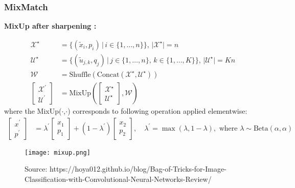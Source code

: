 \documentclass[aspectratio=169,11pt]{beamer}
\begin{document}
\begin{frame}
    \frametitle{MixMatch}
    
    \textbf{MixUp after sharpening :}
    {\footnotesize
    \begin{align*}
        \mathcal{X}^\star &= \{ (\tilde{x}_i,p_i)\,|\, i \in \{1,\dots,n\}  \}, \, |\mathcal{X}^\star| = n \\
        \mathcal{U}^\star &= \{ (\tilde{u}_{j,k},q_j)\,|\, j \in \{1,\dots,n\},\,k \in \{1,\dots,K\}  \}, \, |\mathcal{U}^\star| = Kn\\
        \mathcal{W} &= \text{Shuffle}(\text{Concat}(\mathcal{X}^\star,\mathcal{U}^\star))\\
        \begin{bmatrix} \mathcal{X}^\prime \\ \mathcal{U}^\prime \end{bmatrix} &= \text{MixUp}(\begin{bmatrix} \mathcal{X}^\star \\ \mathcal{U}^\star \end{bmatrix},\mathcal{W}) 
    \end{align*}
    where the MixUp($\cdot$,$\cdot$) corresponds to following operation applied elementwise:
    \begin{align*}
        \begin{bmatrix}x^\prime \\ p^\prime\end{bmatrix} &= \lambda^\prime \begin{bmatrix}
            x_1 \\ p_1
        \end{bmatrix} + (1-\lambda^\prime) \begin{bmatrix}
            x_2 \\ p_2
        \end{bmatrix}, \quad \lambda^\prime = \max(\lambda,1-\lambda), \text{ where } \lambda \sim \text{Beta}(\alpha,\alpha)
    \end{align*}
    \begin{figure}[t]
        \centering
        \texttt{[image: mixup.png]}
        \caption{Source: https://hoya012.github.io/blog/Bag-of-Tricks-for-Image-Classification-with-Convolutional-Neural-Networks-Review/}
    \end{figure}
    }
    
\end{frame}
\end{document}
